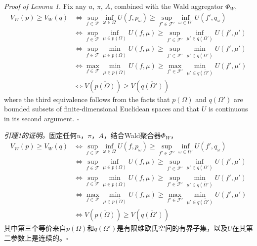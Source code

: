 \documentclass[12pt,a4paper]{article}
\newenvironment{original}
  {\par\vspace{4pt}\noindent\color{black}\ignorespaces}
  {\par\vspace{2pt}}
\newenvironment{translation}
  {\par\vspace{2pt}\noindent\color{myblue}\ignorespaces}
  {\par\vspace{6pt}}
\newcommand{\calF}{\mathcal{F}}
\begin{document}
\begin{original}
\textit{Proof of Lemma 1.} Fix any $u$, $\pi$, $A$, combined with the Wald aggregator $\Phi_W$,
\begin{align}
    V_W(p) \geq V_W(q) &\iff \sup_{f\in\calF} \inf_{\omega\in\Omega} U(f, p_{\omega}) \geq \sup_{f'\in\calF'} \inf_{\omega\in\Omega'} U(f', q_{\omega}) \\
                        &\iff \sup_{f\in\calF} \inf_{\mu\in p(\Omega)} U(f, \mu) \geq \sup_{f'\in\calF'} \inf_{\mu'\in q(\Omega')} U(f', \mu') \\
                        &\iff \sup_{f\in\calF} \min_{\mu\in \overline{p(\Omega)}} U(f, \mu) \geq \sup_{f'\in\calF'} \min_{\mu'\in \overline{q(\Omega')}} U(f', \mu') \\
                        &\iff \max_{f\in\calF} \min_{\mu\in \overline{p(\Omega)}} U(f, \mu) \geq \max_{f'\in\calF'} \min_{\mu'\in \overline{q(\Omega')}} U(f', \mu') \\
                        &\iff V(\overline{p(\Omega)}) \geq V(\overline{q(\Omega')})
\end{align}
where the third equivalence follows from the facts that $p(\Omega)$ and $q(\Omega')$ are bounded subsets of finite-dimensional Euclidean spaces and that $U$ is continuous in its second argument. $\square$
\end{original}

\begin{translation}
\textit{引理1的证明。}固定任何$u$，$\pi$，$A$，结合Wald聚合器$\Phi_W$，
\begin{align}
    V_W(p) \geq V_W(q) &\iff \sup_{f\in\calF} \inf_{\omega\in\Omega} U(f, p_{\omega}) \geq \sup_{f'\in\calF'} \inf_{\omega\in\Omega'} U(f', q_{\omega}) \\
                        &\iff \sup_{f\in\calF} \inf_{\mu\in p(\Omega)} U(f, \mu) \geq \sup_{f'\in\calF'} \inf_{\mu'\in q(\Omega')} U(f', \mu') \\
                        &\iff \sup_{f\in\calF} \min_{\mu\in \overline{p(\Omega)}} U(f, \mu) \geq \sup_{f'\in\calF'} \min_{\mu'\in \overline{q(\Omega')}} U(f', \mu') \\
                        &\iff \max_{f\in\calF} \min_{\mu\in \overline{p(\Omega)}} U(f, \mu) \geq \max_{f'\in\calF'} \min_{\mu'\in \overline{q(\Omega')}} U(f', \mu') \\
                        &\iff V(\overline{p(\Omega)}) \geq V(\overline{q(\Omega')})
\end{align}
其中第三个等价来自$p(\Omega)$和$q(\Omega')$是有限维欧氏空间的有界子集，以及$U$在其第二参数上是连续的。$\square$
\end{translation}
\end{document}
